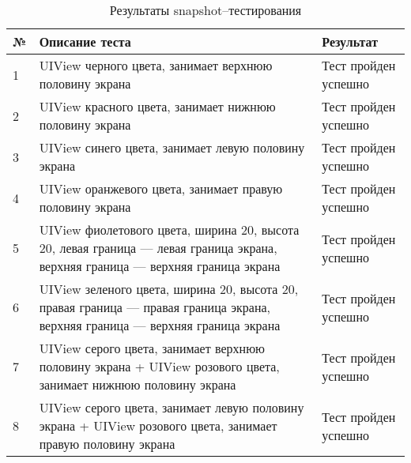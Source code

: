\begin{table}[!htb]
 \label{table:tests1}
 \begin{center}
  \caption{Результаты snapshot--тестирования}
 \begin{tabular}{|p{0.6cm}|p{10cm}|p{5cm}|}
  \hline
   \bfseries № & \bfseries Описание теста & \bfseries Результат \\ \hline
   1 & UIView черного цвета, занимает верхнюю половину экрана & Тест пройден успешно  \\ \hline
   2 & UIView красного цвета, занимает нижнюю половину экрана & Тест пройден успешно  \\ \hline
   3 & UIView синего цвета, занимает левую половину экрана  & Тест пройден успешно  \\ \hline      
   4 & UIView оранжевого цвета, занимает правую половину экрана  & Тест пройден успешно  \\ \hline
   5 & UIView фиолетового цвета, ширина 20, высота 20, левая граница --- левая граница экрана, верхняя граница --- верхняя граница экрана & Тест пройден успешно  \\ \hline
   6 & UIView зеленого цвета, ширина 20, высота 20, правая граница --- правая граница экрана, верхняя граница --- верхняя граница экрана & Тест пройден успешно  \\ \hline
   7 & UIView серого цвета, занимает верхнюю половину экрана + UIView розового цвета, занимает нижнюю половину экрана & Тест пройден успешно  \\ \hline
   8 & UIView серого цвета, занимает левую половину экрана + UIView розового цвета, занимает правую половину экрана & Тест пройден успешно  \\ \hline
  \hline
  \end{tabular}
 \end{center}
\end{table}

